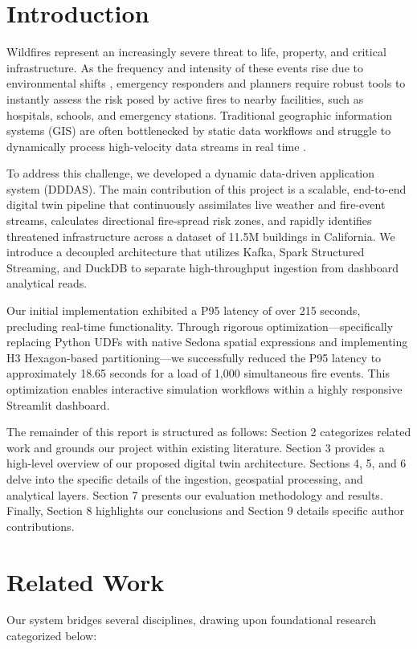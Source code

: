 \documentclass[acmsmall,screen,nonacm]{acmart}
\begin{document}
\section{Introduction}
Wildfires represent an increasingly severe threat to life, property, and critical infrastructure. As the frequency and intensity of these events rise due to environmental shifts \cite{abatzoglou2016impact, doerr2016global}, emergency responders and planners require robust tools to instantly assess the risk posed by active fires to nearby facilities, such as hospitals, schools, and emergency stations. Traditional geographic information systems (GIS) are often bottlenecked by static data workflows and struggle to dynamically process high-velocity data streams in real time \cite{li2020realtime}.

To address this challenge, we developed a dynamic data-driven application system (DDDAS). The main contribution of this project is a scalable, end-to-end digital twin pipeline that continuously assimilates live weather and fire-event streams, calculates directional fire-spread risk zones, and rapidly identifies threatened infrastructure across a dataset of 11.5M buildings in California. We introduce a decoupled architecture that utilizes Kafka, Spark Structured Streaming, and DuckDB to separate high-throughput ingestion from dashboard analytical reads. 

Our initial implementation exhibited a P95 latency of over 215 seconds, precluding real-time functionality. Through rigorous optimization—specifically replacing Python UDFs with native Sedona spatial expressions and implementing H3 Hexagon-based partitioning—we successfully reduced the P95 latency to approximately 18.65 seconds for a load of 1,000 simultaneous fire events. This optimization enables interactive simulation workflows within a highly responsive Streamlit dashboard.

The remainder of this report is structured as follows: Section 2 categorizes related work and grounds our project within existing literature. Section 3 provides a high-level overview of our proposed digital twin architecture. Sections 4, 5, and 6 delve into the specific details of the ingestion, geospatial processing, and analytical layers. Section 7 presents our evaluation methodology and results. Finally, Section 8 highlights our conclusions and Section 9 details specific author contributions.

\section{Related Work}
Our system bridges several disciplines, drawing upon foundational research categorized below:
\end{document}
